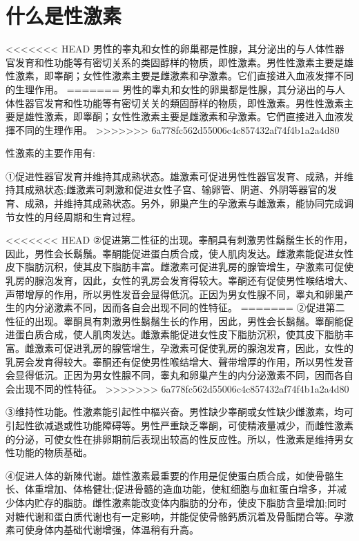 \documentclass[12pt,UTF8]{ctexbook}
\begin{document}
\section{什么是性激素}

<<<<<<< HEAD
男性的睾丸和女性的卵巢都是性腺，其分泌出的与人体性器官发育和性功能等有密切关系的类固醇样的物质，即性激素。男性性激素主要是雄性激素，即睾酮；女性性激素主要是雌激素和孕激素。它们直接进入血液发揮不同的生理作用。
=======
男性的睾丸和女性的卵巢都是性腺，其分泌出的与人体性器官发育和性功能等有密切关关的類固醇样的物质，即性激素。男性性激素主要是雄性激素，即睾酮；女性性激素主要是雌激素和孕激素。它們直接进入血液发揮不同的生理作用。
>>>>>>> 6a778fc562d55006c4c857432af74f4b1a2a4d80

性激素的主要作用有:

①促进性器官发育并维持其成熟状态。雄激素可促进男性性器官发育、成熟，并维持其成熟状态;雌激素可刺激和促进女性子宫、输卵管、阴道、外阴等器官的发育、成熟，并维持其成熟状态。另外，卵巢产生的孕激素与雌激素，能协同完成调节女性的月经周期和生育过程。

<<<<<<< HEAD
②促进第二性征的出现。睾酮具有刺激男性鬍鬚生长的作用，因此，男性会长鬍鬚。睾酮能促进蛋白质合成，使人肌肉发达。雌激素能促进女性皮下脂肪沉积，使其皮下脂肪丰富。雌激素可促进乳房的腺管增生，孕激素可促使乳房的腺泡发育，因此，女性的乳房会发育得较大。睾酮还有促使男性喉结增大、声带增厚的作用，所以男性发音会显得低沉。正因为男女性腺不同，睾丸和卵巢产生的内分泌激素不同，因而各自会出现不同的性特征。
=======
②促进第二性征的出现。睾酮具有刺激男性鬍鬚生长的作用，因此，男性会长鬍鬚。睾酮能促进蛋白质合成，使人肌肉发达。雌激素能促进女性皮下脂肪沉积，使其皮下脂肪丰富。雌激素可促进乳房的腺管增生，孕激素可促使乳房的腺泡发育，因此，女性的乳房会发育得较大。睾酮还有促使男性喉结增大、聲带增厚的作用，所以男性发音会显得低沉。正因为男女性腺不同，睾丸和卵巢产生的内分泌激素不同，因而各自会出现不同的性特征。
>>>>>>> 6a778fc562d55006c4c857432af74f4b1a2a4d80

③维持性功能。性激素能引起性中樞兴奋。男性缺少睾酮或女性缺少雌激素，均可引起性欲减退或性功能障碍等。男性严重缺乏睾酮，可使精液量减少，而雌性激素的分泌，可使女性在排卵期前后表现出较高的性反应性。所以，性激素是维持男女性功能的物质基础。

④促进人体的新陳代谢。雄性激素最重要的作用是促使蛋白质合成，如使骨骼生长、体重增加、体格健壮;促进骨髓的造血功能，使紅细胞与血紅蛋白增多，并减少体内贮存的脂肪。雌性激素能改变体内脂肪的分布，使皮下脂肪含量增加;同时对糖代谢和蛋白质代谢也有一定影响，并能促使骨骼鈣质沉着及骨骺閉合等。孕激素可使身体内基础代谢增强，体温稍有升高。
\end{document}
